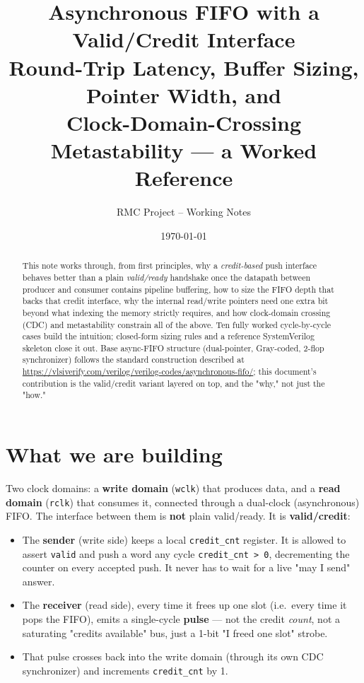 \documentclass[12pt]{article}
\title{\textbf{Asynchronous FIFO with a Valid/Credit Interface}\\[4pt]
\large Round-Trip Latency, Buffer Sizing, Pointer Width, and\\
Clock-Domain-Crossing Metastability --- a Worked Reference}
\author{RMC Project -- Working Notes}
\date{\today}
\begin{document}
\maketitle

\begin{abstract}
\noindent
This note works through, from first principles, why a \emph{credit-based}
push interface behaves better than a plain \emph{valid/ready} handshake once
the datapath between producer and consumer contains pipeline buffering, how
to size the FIFO depth that backs that credit interface, why the internal
read/write pointers need one extra bit beyond what indexing the memory
strictly requires, and how clock-domain crossing (CDC) and metastability
constrain all of the above. Ten fully worked cycle-by-cycle cases build the
intuition; closed-form sizing rules and a reference SystemVerilog skeleton
close it out. Base async-FIFO structure (dual-pointer, Gray-coded, 2-flop
synchronizer) follows the standard construction described at
\url{https://vlsiverify.com/verilog/verilog-codes/asynchronous-fifo/}; this
document's contribution is the valid/credit variant layered on top, and the
"why," not just the "how."
\end{abstract}

\tableofcontents
\clearpage

\section{What we are building}

Two clock domains: a \textbf{write domain} (\texttt{wclk}) that produces
data, and a \textbf{read domain} (\texttt{rclk}) that consumes it, connected
through a dual-clock (asynchronous) FIFO. The interface between them is
\textbf{not} plain valid/ready. It is \textbf{valid/credit}:

\begin{itemize}[leftmargin=1.4em]
  \item The \textbf{sender} (write side) keeps a local \texttt{credit\_cnt}
  register. It is allowed to assert \texttt{valid} and push a word any cycle
  \texttt{credit\_cnt > 0}, decrementing the counter on every accepted push.
  It never has to wait for a live "may I send" answer.
  \item The \textbf{receiver} (read side), every time it frees up one slot
  (i.e.\ every time it pops the FIFO), emits a single-cycle \textbf{pulse} —
  not the credit \emph{count}, not a saturating "credits available" bus,
  just a 1-bit "I freed one slot" strobe.
  \item That pulse crosses back into the write domain (through its own CDC
  synchronizer) and increments \texttt{credit\_cnt} by 1.
\end{itemize}
\end{document}
